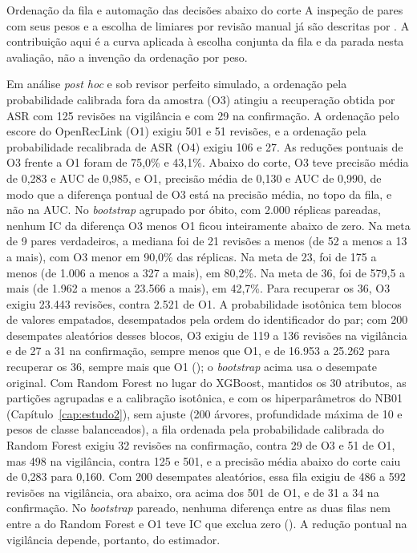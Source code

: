 \begin{chapter}{Ordenação da fila e automação das decisões abaixo do corte}
A inspeção de pares com seus pesos e a escolha de limiares por revisão manual já são descritas por . A contribuição aqui é a curva aplicada à escolha conjunta da fila e da parada nesta avaliação, não a invenção da ordenação por peso.



Em análise \textit{post hoc} e sob revisor perfeito simulado, a ordenação pela probabilidade calibrada fora da amostra (O3) atingiu a recuperação obtida por ASR com 125 revisões na vigilância e com 29 na confirmação. A ordenação pelo escore do OpenRecLink (O1) exigiu 501 e 51 revisões, e a ordenação pela probabilidade recalibrada de ASR (O4) exigiu 106 e 27. As reduções pontuais de O3 frente a O1 foram de 75,0\% e 43,1\%. Abaixo do corte, O3 teve precisão média de 0,283 e AUC de 0,985, e O1, precisão média de 0,130 e AUC de 0,990, de modo que a diferença pontual de O3 está na precisão média, no topo da fila, e não na AUC. No \textit{bootstrap} agrupado por óbito, com 2.000 réplicas pareadas, nenhum IC da diferença O3 menos O1 ficou inteiramente abaixo de zero. Na meta de 9 pares verdadeiros, a mediana foi de 21 revisões a menos (de 52 a menos a 13 a mais), com O3 menor em 90,0\% das réplicas. Na meta de 23, foi de 175 a menos (de 1.006 a menos a 327 a mais), em 80,2\%. Na meta de 36, foi de 579,5 a mais (de 1.962 a menos a 23.566 a mais), em 42,7\%. Para recuperar os 36, O3 exigiu 23.443 revisões, contra 2.521 de O1. A probabilidade isotônica tem blocos de valores empatados, desempatados pela ordem do identificador do par; com 200 desempates aleatórios desses blocos, O3 exigiu de 119 a 136 revisões na vigilância e de 27 a 31 na confirmação, sempre menos que O1, e de 16.953 a 25.262 para recuperar os 36, sempre mais que O1 (); o \textit{bootstrap} acima usa o desempate original. Com Random Forest no lugar do XGBoost, mantidos os 30 atributos, as partições agrupadas e a calibração isotônica, e com os hiperparâmetros do NB01 (Capítulo~\ref{cap:estudo2}), sem ajuste (200 árvores, profundidade máxima de 10 e pesos de classe balanceados), a fila ordenada pela probabilidade calibrada do Random Forest exigiu 32 revisões na confirmação, contra 29 de O3 e 51 de O1, mas 498 na vigilância, contra 125 e 501, e a precisão média abaixo do corte caiu de 0,283 para 0,160. Com 200 desempates aleatórios, essa fila exigiu de 486 a 592 revisões na vigilância, ora abaixo, ora acima dos 501 de O1, e de 31 a 34 na confirmação. No \textit{bootstrap} pareado, nenhuma diferença entre as duas filas nem entre a do Random Forest e O1 teve IC que exclua zero (). A redução pontual na vigilância depende, portanto, do estimador.


\end{chapter}
